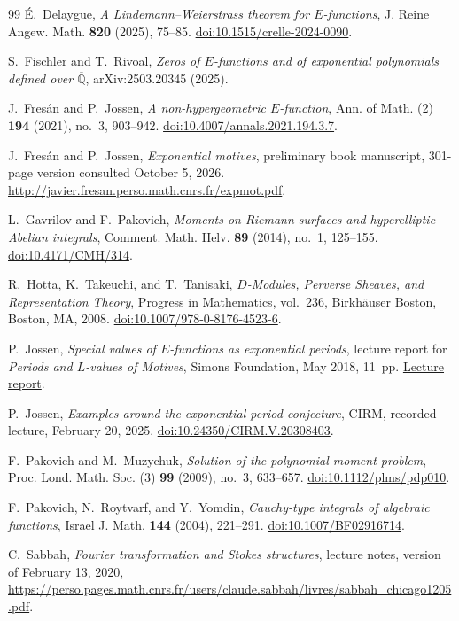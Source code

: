 \documentclass[11pt]{article}
\numberwithin{equation}{section}
\theoremstyle{definition}
\theoremstyle{remark}
\begin{document}
\begin{thebibliography}{99}
\'E.~Delaygue,
\emph{A Lindemann--Weierstrass theorem for $E$-functions},
J. Reine Angew. Math. \textbf{820} (2025), 75--85.
\href{https://doi.org/10.1515/crelle-2024-0090}{doi:10.1515/crelle-2024-0090}.

S.~Fischler and T.~Rivoal,
\emph{Zeros of $E$-functions and of exponential polynomials defined over
$\overline{\mathbb Q}$},
arXiv:2503.20345 (2025).

J.~Fres\'an and P.~Jossen,
\emph{A non-hypergeometric $E$-function},
Ann. of Math. (2) \textbf{194} (2021), no.~3, 903--942.
\href{https://doi.org/10.4007/annals.2021.194.3.7}{doi:10.4007/annals.2021.194.3.7}.

J.~Fres\'an and P.~Jossen,
\emph{Exponential motives},
preliminary book manuscript, 301-page version consulted October 5, 2026.
\url{http://javier.fresan.perso.math.cnrs.fr/expmot.pdf}.

L.~Gavrilov and F.~Pakovich,
\emph{Moments on Riemann surfaces and hyperelliptic Abelian integrals},
Comment. Math. Helv. \textbf{89} (2014), no.~1, 125--155.
\href{https://doi.org/10.4171/CMH/314}{doi:10.4171/CMH/314}.

R.~Hotta, K.~Takeuchi, and T.~Tanisaki,
\emph{$D$-Modules, Perverse Sheaves, and Representation Theory},
Progress in Mathematics, vol.~236,
Birkh\"auser Boston, Boston, MA, 2008.
\href{https://doi.org/10.1007/978-0-8176-4523-6}{doi:10.1007/978-0-8176-4523-6}.

P.~Jossen,
\emph{Special values of $E$-functions as exponential periods},
lecture report for \emph{Periods and $L$-values of Motives},
Simons Foundation, May 2018, 11~pp.
\href{https://simonsfoundation.s3.amazonaws.com/share/mps/symposia/2018/pdf/palvom/Report_Jossen.pdf}{Lecture report}.

P.~Jossen,
\emph{Examples around the exponential period conjecture},
CIRM, recorded lecture, February 20, 2025.
\href{https://doi.org/10.24350/CIRM.V.20308403}{doi:10.24350/CIRM.V.20308403}.

F.~Pakovich and M.~Muzychuk,
\emph{Solution of the polynomial moment problem},
Proc. Lond. Math. Soc. (3) \textbf{99} (2009), no.~3, 633--657.
\href{https://doi.org/10.1112/plms/pdp010}{doi:10.1112/plms/pdp010}.

F.~Pakovich, N.~Roytvarf, and Y.~Yomdin,
\emph{Cauchy-type integrals of algebraic functions},
Israel J. Math. \textbf{144} (2004), 221--291.
\href{https://doi.org/10.1007/BF02916714}{doi:10.1007/BF02916714}.

C.~Sabbah,
\emph{Fourier transformation and Stokes structures},
lecture notes, version of February 13, 2020,
\url{https://perso.pages.math.cnrs.fr/users/claude.sabbah/livres/sabbah_chicago1205.pdf}.

\end{thebibliography}
\end{document}
